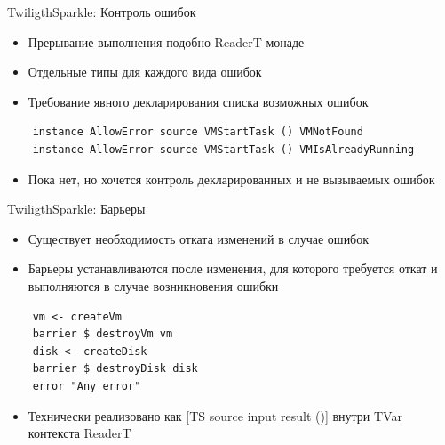 \documentclass[10pt]{beamer}
\begin{document}
\begin{frame}[fragile]{TwiligthSparkle: Контроль ошибок}

  \begin{itemize}
    \item Прерывание выполнения подобно ReaderT монаде
    \item Отдельные типы для каждого вида ошибок
    \item Требование явного декларирования списка возможных ошибок
    \end{itemize}
  \begin{verbatim}
    instance AllowError source VMStartTask () VMNotFound
    instance AllowError source VMStartTask () VMIsAlreadyRunning
  \end{verbatim}
  \begin{itemize}
    \item Пока нет, но хочется контроль декларированных и не вызываемых ошибок
  \end{itemize}
\end{frame}

\begin{frame}[fragile]{TwiligthSparkle: Барьеры}

  \begin{itemize}
    \item Существует необходимость отката изменений в случае ошибок
    \item Барьеры устанавливаются после изменения, для которого требуется откат
     и выполняются в случае возникновения ошибки
  \end{itemize}
  \begin{verbatim}
    vm <- createVm
    barrier $ destroyVm vm
    disk <- createDisk
    barrier $ destroyDisk disk
    error "Any error"
  \end{verbatim}
  \begin{itemize}
    \item Технически реализовано как [TS source input result ()]
     внутри TVar контекста ReaderT
  \end{itemize}

\end{frame}
\end{document}
